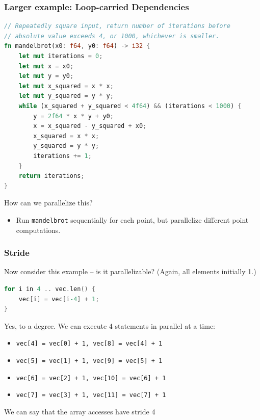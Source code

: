 \begin{frame}[fragile]
\frametitle{Larger example: Loop-carried Dependencies}
{\small
\begin{lstlisting}[language=Rust]
// Repeatedly square input, return number of iterations before
// absolute value exceeds 4, or 1000, whichever is smaller.
fn mandelbrot(x0: f64, y0: f64) -> i32 {
    let mut iterations = 0;
    let mut x = x0;
    let mut y = y0;
    let mut x_squared = x * x;
    let mut y_squared = y * y;
    while (x_squared + y_squared < 4f64) && (iterations < 1000) {
        y = 2f64 * x * y + y0;
        x = x_squared - y_squared + x0;
        x_squared = x * x;
        y_squared = y * y;
        iterations += 1;
    }
    return iterations;
}
\end{lstlisting}
}
How can we parallelize this? \\
\pause
\begin{itemize}
\item Run {\tt mandelbrot} sequentially for each point, but parallelize
different point computations.
\end{itemize}
\end{frame}


\begin{frame}[fragile]
\frametitle{Stride}

 Now consider this example -- is it parallelizable? (Again, all elements initially 1.)

\begin{lstlisting}[language=C]
for i in 4 .. vec.len() {
    vec[i] = vec[i-4] + 1;
}
\end{lstlisting}

\pause

Yes, to a degree. We can execute 4 statements in parallel at a time:
\begin{itemize}
  \item \texttt{vec[4] = vec[0] + 1, vec[8] = vec[4] + 1}
  \item \texttt{vec[5] = vec[1] + 1, vec[9] = vec[5] + 1}
  \item \texttt{vec[6] = vec[2] + 1, vec[10] = vec[6] + 1}
  \item \texttt{vec[7] = vec[3] + 1, vec[11] = vec[7] + 1}
\end{itemize}  
We can say that the array accesses have stride 4

\end{frame}



